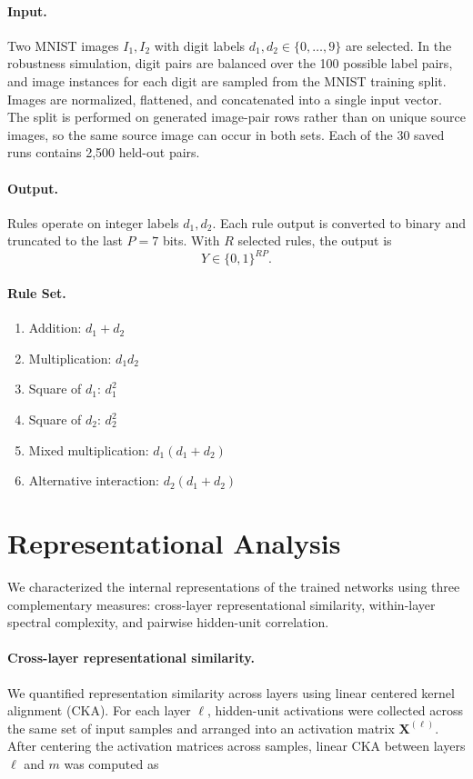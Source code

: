 \documentclass{article}
\begin{document}
\paragraph{Input.}
Two MNIST images $I_1,I_2$ with digit labels $d_1,d_2\in\{0,\dots,9\}$ are selected. In the robustness simulation, digit pairs are balanced over the 100 possible label pairs, and image instances for each digit are sampled from the MNIST training split. Images are normalized, flattened, and concatenated into a single input vector. The split is performed on generated image-pair rows rather than on unique source images, so the same source image can occur in both sets. Each of the 30 saved runs contains 2,500 held-out pairs.

\paragraph{Output.}
Rules operate on integer labels $d_1,d_2$. Each rule output is converted to binary and truncated to the last $P=7$ bits. With $R$ selected rules, the output is
\[
Y \in \{0,1\}^{RP}.
\]

\paragraph{Rule Set.}
\begin{enumerate}
    \item Addition: $d_1+d_2$
    \item Multiplication: $d_1d_2$
    \item Square of $d_1$: $d_1^2$
    \item Square of $d_2$: $d_2^2$
    \item Mixed multiplication: $d_1(d_1+d_2)$
    \item Alternative interaction: $d_2(d_1+d_2)$
\end{enumerate}

\section{Representational Analysis}
\label{appendix:representational}

We characterized the internal representations of the trained networks using three complementary measures: cross-layer representational similarity, within-layer spectral complexity, and pairwise hidden-unit correlation.

\paragraph{Cross-layer representational similarity.}
We quantified representation similarity across layers using linear centered kernel alignment (CKA). For each layer $\ell$, hidden-unit activations were collected across the same set of input samples and arranged into an activation matrix $\mathbf{X}^{(\ell)}$. After centering the activation matrices across samples, linear CKA between layers $\ell$ and $m$ was computed as
\end{document}
